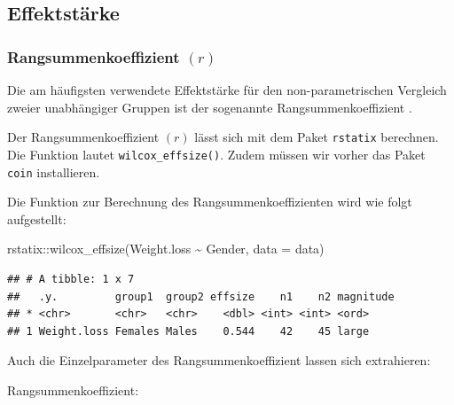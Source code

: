 \documentclass[
]{book}
\newenvironment{Shaded}{\begin{snugshade}}{\end{snugshade}}
\newcommand{\AttributeTok}[1]{\textcolor[rgb]{0.77,0.63,0.00}{#1}}
\newcommand{\FunctionTok}[1]{\textcolor[rgb]{0.00,0.00,0.00}{#1}}
\newcommand{\NormalTok}[1]{#1}
\newcommand{\SpecialCharTok}[1]{\textcolor[rgb]{0.00,0.00,0.00}{#1}}
\begin{document}
\hypertarget{effektstuxe4rke-3}{%
\subsection{Effektstärke}\label{effektstuxe4rke-3}}

\hypertarget{rangsummenkoeffizient-r}{%
\subsubsection{\texorpdfstring{Rangsummenkoeffizient \((r)\)}{Rangsummenkoeffizient (r)}}\label{rangsummenkoeffizient-r}}

Die am häufigsten verwendete Effektstärke für den non-parametrischen Vergleich zweier unabhängiger Gruppen ist der sogenannte Rangsummenkoeffizient \citep{tomczak2014need}.

Der Rangsummenkoeffizient \((r)\) lässt sich mit dem Paket \texttt{rstatix} berechnen. Die Funktion lautet \texttt{wilcox\_effsize()}. Zudem müssen wir vorher das Paket \texttt{coin} installieren.

Die Funktion zur Berechnung des Rangsummenkoeffizienten wird wie folgt aufgestellt:

\begin{Shaded}
\begin{Highlighting}[]
\NormalTok{rstatix}\SpecialCharTok{::}\FunctionTok{wilcox\_effsize}\NormalTok{(Weight.loss }\SpecialCharTok{\textasciitilde{}}\NormalTok{ Gender, }\AttributeTok{data =}\NormalTok{ data)}
\end{Highlighting}
\end{Shaded}

\begin{verbatim}
## # A tibble: 1 x 7
##   .y.         group1  group2 effsize    n1    n2 magnitude
## * <chr>       <chr>   <chr>    <dbl> <int> <int> <ord>    
## 1 Weight.loss Females Males    0.544    42    45 large
\end{verbatim}

Auch die Einzelparameter des Rangsummenkoeffizient lassen sich extrahieren:

Rangsummenkoeffizient:

\begin{Shaded}
\end{Shaded}
\end{document}
